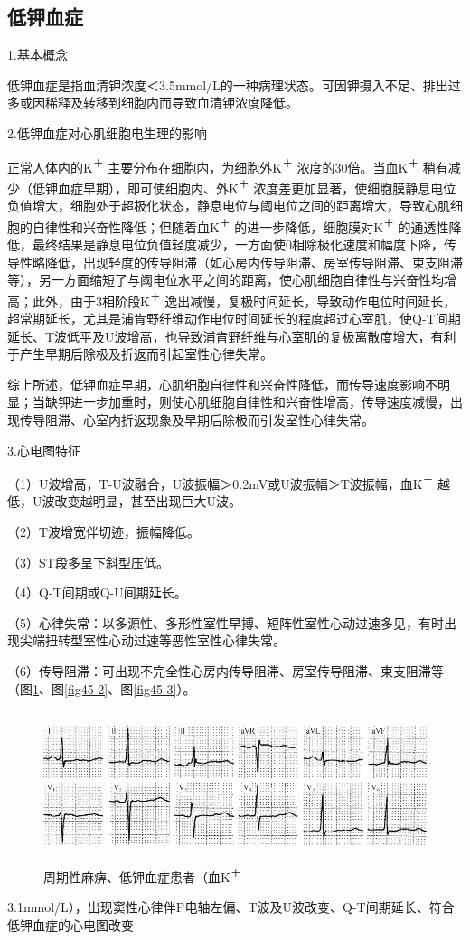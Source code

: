 \subsection{低钾血症}

1.基本概念

低钾血症是指血清钾浓度＜3.5mmol/L的一种病理状态。可因钾摄入不足、排出过多或因稀释及转移到细胞内而导致血清钾浓度降低。

2.低钾血症对心肌细胞电生理的影响

正常人体内的K\textsuperscript{＋}
主要分布在细胞内，为细胞外K\textsuperscript{＋}
浓度的30倍。当血K\textsuperscript{＋}
稍有减少（低钾血症早期），即可使细胞内、外K\textsuperscript{＋}
浓度差更加显著，使细胞膜静息电位负值增大，细胞处于超极化状态，静息电位与阈电位之间的距离增大，导致心肌细胞的自律性和兴奋性降低；但随着血K\textsuperscript{＋}
的进一步降低，细胞膜对K\textsuperscript{＋}
的通透性降低，最终结果是静息电位负值轻度减少，一方面使0相除极化速度和幅度下降，传导性略降低，出现轻度的传导阻滞（如心房内传导阻滞、房室传导阻滞、束支阻滞等），另一方面缩短了与阈电位水平之间的距离，使心肌细胞自律性与兴奋性均增高；此外，由于3相阶段K\textsuperscript{＋}
逸出减慢，复极时间延长，导致动作电位时间延长，超常期延长，尤其是浦肯野纤维动作电位时间延长的程度超过心室肌，使Q-T间期延长、T波低平及U波增高，也导致浦肯野纤维与心室肌的复极离散度增大，有利于产生早期后除极及折返而引起室性心律失常。

综上所述，低钾血症早期，心肌细胞自律性和兴奋性降低，而传导速度影响不明显；当缺钾进一步加重时，则使心肌细胞自律性和兴奋性增高，传导速度减慢，出现传导阻滞、心室内折返现象及早期后除极而引发室性心律失常。

3.心电图特征

（1）U波增高，T-U波融合，U波振幅＞0.2mV或U波振幅＞T波振幅，血K\textsuperscript{＋}
越低，U波改变越明显，甚至出现巨大U波。

（2）T波增宽伴切迹，振幅降低。

（3）ST段多呈下斜型压低。

（4）Q-T间期或Q-U间期延长。

（5）心律失常：以多源性、多形性室性早搏、短阵性室性心动过速多见，有时出现尖端扭转型室性心动过速等恶性室性心律失常。

（6）传导阻滞：可出现不完全性心房内传导阻滞、房室传导阻滞、束支阻滞等（图\ref{fig45-1}、图\ref{fig45-2}、图\ref{fig45-3}）。

\begin{figure}[!htbp]
 \centering
 \includegraphics[width=5.58333in,height=1.72917in]{./images/Image00729.jpg}
 \captionsetup{justification=centering}
 \caption{周期性麻痹、低钾血症患者（血K\textsuperscript{＋}}
 \label{fig45-1}
  \end{figure} 
3.1mmol/L），出现窦性心律伴P电轴左偏、T波及U波改变、Q-T间期延长、符合低钾血症的心电图改变

